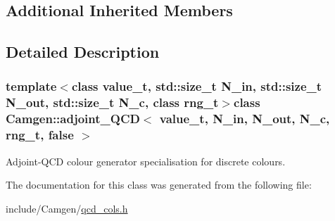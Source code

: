 \subsection*{Additional Inherited Members}


\subsection{Detailed Description}
\subsubsection*{template$<$class value\-\_\-t, std\-::size\-\_\-t N\-\_\-in, std\-::size\-\_\-t N\-\_\-out, std\-::size\-\_\-t N\-\_\-c, class rng\-\_\-t$>$class Camgen\-::adjoint\-\_\-\-Q\-C\-D$<$ value\-\_\-t, N\-\_\-in, N\-\_\-out, N\-\_\-c, rng\-\_\-t, false $>$}

Adjoint-\/\-Q\-C\-D colour generator specialisation for discrete colours. 

The documentation for this class was generated from the following file\-:\begin{DoxyCompactItemize}
\item 
include/\-Camgen/\hyperlink{a00724}{qcd\-\_\-cols.\-h}\end{DoxyCompactItemize}
